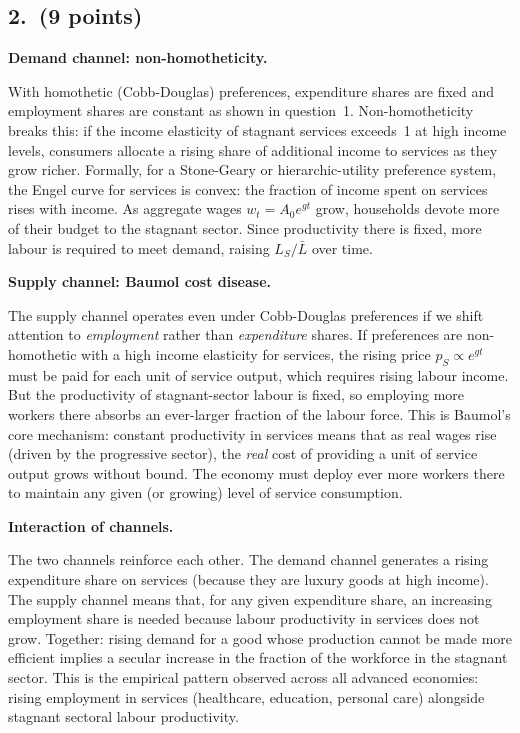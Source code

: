 \documentclass[a4paper,11pt]{article}
\begin{document}
\subsection*{2.\ (9 points)}

\begin{answerbox}
\textbf{Demand channel: non-homotheticity.}

With homothetic (Cobb-Douglas) preferences, expenditure shares are fixed and employment shares are constant as shown in question~1.  Non-homotheticity breaks this: if the income elasticity of stagnant services exceeds~1 at high income levels, consumers allocate a rising share of additional income to services as they grow richer.  Formally, for a Stone-Geary or hierarchic-utility preference system, the Engel curve for services is convex: the fraction of income spent on services rises with income.  As aggregate wages $w_t = A_0 e^{gt}$ grow, households devote more of their budget to the stagnant sector.  Since productivity there is fixed, more labour is required to meet demand, raising $L_S/\bar{L}$ over time.

\textbf{Supply channel: Baumol cost disease.}

The supply channel operates even under Cobb-Douglas preferences if we shift attention to \emph{employment} rather than \emph{expenditure} shares.  If preferences are non-homothetic with a high income elasticity for services, the rising price $p_S \propto e^{gt}$ must be paid for each unit of service output, which requires rising labour income.  But the productivity of stagnant-sector labour is fixed, so employing more workers there absorbs an ever-larger fraction of the labour force.  This is Baumol's core mechanism: constant productivity in services means that as real wages rise (driven by the progressive sector), the \emph{real} cost of providing a unit of service output grows without bound.  The economy must deploy ever more workers there to maintain any given (or growing) level of service consumption.

\textbf{Interaction of channels.}

The two channels reinforce each other.  The demand channel generates a rising expenditure share on services (because they are luxury goods at high income).  The supply channel means that, for any given expenditure share, an increasing employment share is needed because labour productivity in services does not grow.  Together: rising demand for a good whose production cannot be made more efficient implies a secular increase in the fraction of the workforce in the stagnant sector.  This is the empirical pattern observed across all advanced economies: rising employment in services (healthcare, education, personal care) alongside stagnant sectoral labour productivity.
\end{answerbox}
\end{document}
